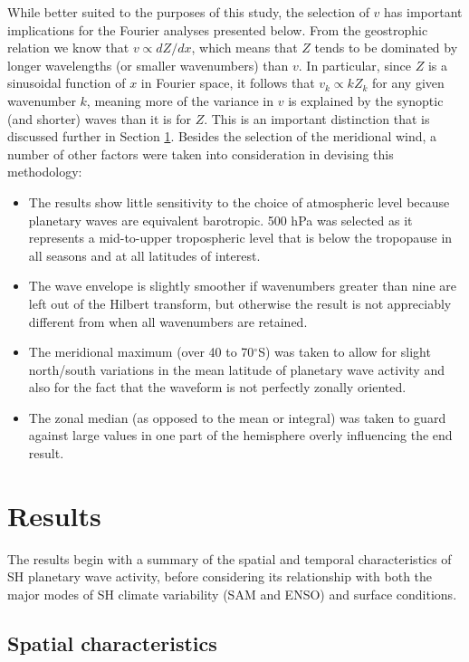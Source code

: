 While better suited to the purposes of this study, the selection of $v$ has important implications for the Fourier analyses presented below. From the geostrophic relation we know that $v \propto dZ / dx$, which means that $Z$ tends to be dominated by longer wavelengths (or smaller wavenumbers) than $v$. In particular, since $Z$ is a sinusoidal function of $x$ in Fourier space, it follows that $v_k \propto k Z_k$ for any given wavenumber $k$, meaning more of the variance in $v$ is explained by the synoptic (and shorter) waves than it is for $Z$. This is an important distinction that is discussed further in Section \ref{s:zw_results}. Besides the selection of the meridional wind, a number of other factors were taken into consideration in devising this methodology:
\begin{itemize}
\item The results show little sensitivity to the choice of atmospheric level because planetary waves are equivalent barotropic. 500 hPa was selected as it represents a mid-to-upper tropospheric level that is below the tropopause in all seasons and at all latitudes of interest.
\item The wave envelope is slightly smoother if wavenumbers greater than nine are left out of the Hilbert transform, but otherwise the result is not appreciably different from when all wavenumbers are retained.
\item The meridional maximum (over 40 to 70$^{\circ}$S) was taken to allow for slight north/south variations in the mean latitude of planetary wave activity and also for the fact that the waveform is not perfectly zonally oriented. 
\item The zonal median (as opposed to the mean or integral) was taken to guard against large values in one part of the hemisphere overly influencing the end result.
\end{itemize}

      

\section{Results}\label{s:zw_results}

The results begin with a summary of the spatial and temporal characteristics of SH planetary wave activity, before considering its relationship with both the major modes of SH climate variability (SAM and ENSO) and surface conditions. 

\subsection{Spatial characteristics}\label{s:zw_spatial_characteristics}

